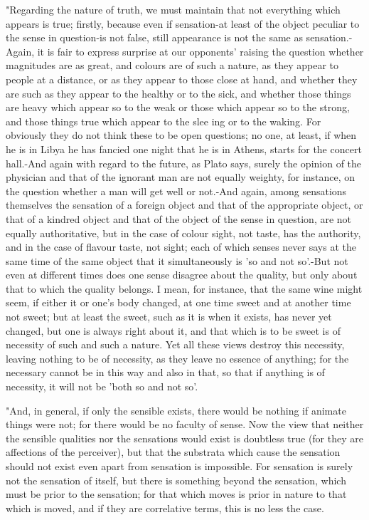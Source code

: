 "Regarding the nature of truth, we must maintain that not everything
which appears is true; firstly, because even if sensation-at least
of the object peculiar to the sense in question-is not false, still
appearance is not the same as sensation.-Again, it is fair to express
surprise at our opponents' raising the question whether magnitudes
are as great, and colours are of such a nature, as they appear to
people at a distance, or as they appear to those close at hand, and
whether they are such as they appear to the healthy or to the sick,
and whether those things are heavy which appear so to the weak or
those which appear so to the strong, and those things true which appear
to the slee ing or to the waking. For obviously they do not think
these to be open questions; no one, at least, if when he is in Libya
he has fancied one night that he is in Athens, starts for the concert
hall.-And again with regard to the future, as Plato says, surely the
opinion of the physician and that of the ignorant man are not equally
weighty, for instance, on the question whether a man will get well
or not.-And again, among sensations themselves the sensation of a
foreign object and that of the appropriate object, or that of a kindred
object and that of the object of the sense in question, are not equally
authoritative, but in the case of colour sight, not taste, has the
authority, and in the case of flavour taste, not sight; each of which
senses never says at the same time of the same object that it simultaneously
is 'so and not so'.-But not even at different times does one sense
disagree about the quality, but only about that to which the quality
belongs. I mean, for instance, that the same wine might seem, if either
it or one's body changed, at one time sweet and at another time not
sweet; but at least the sweet, such as it is when it exists, has never
yet changed, but one is always right about it, and that which is to
be sweet is of necessity of such and such a nature. Yet all these
views destroy this necessity, leaving nothing to be of necessity,
as they leave no essence of anything; for the necessary cannot be
in this way and also in that, so that if anything is of necessity,
it will not be 'both so and not so'. 

"And, in general, if only the sensible exists, there would be nothing
if animate things were not; for there would be no faculty of sense.
Now the view that neither the sensible qualities nor the sensations
would exist is doubtless true (for they are affections of the perceiver),
but that the substrata which cause the sensation should not exist
even apart from sensation is impossible. For sensation is surely not
the sensation of itself, but there is something beyond the sensation,
which must be prior to the sensation; for that which moves is prior
in nature to that which is moved, and if they are correlative terms,
this is no less the case. 

